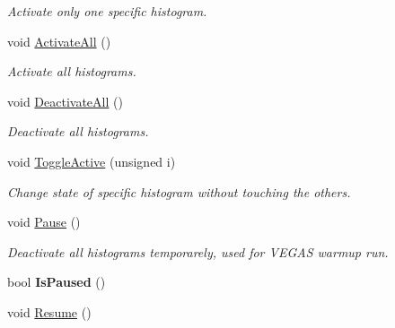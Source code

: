 \begin{DoxyCompactItemize}
\begin{DoxyCompactList}\small\item\em Activate only one specific histogram. \end{DoxyCompactList}\item 
\hypertarget{classHistArray_ab04978eb90a87464603e46337da965f0}{}void \hyperlink{classHistArray_ab04978eb90a87464603e46337da965f0}{Activate\+All} ()\label{classHistArray_ab04978eb90a87464603e46337da965f0}

\begin{DoxyCompactList}\small\item\em Activate all histograms. \end{DoxyCompactList}\item 
\hypertarget{classHistArray_a74a91eee643bcadc657103521549d275}{}void \hyperlink{classHistArray_a74a91eee643bcadc657103521549d275}{Deactivate\+All} ()\label{classHistArray_a74a91eee643bcadc657103521549d275}

\begin{DoxyCompactList}\small\item\em Deactivate all histograms. \end{DoxyCompactList}\item 
\hypertarget{classHistArray_ab6d76cb0d5bf1915dbc48f53ce498bb2}{}void \hyperlink{classHistArray_ab6d76cb0d5bf1915dbc48f53ce498bb2}{Toggle\+Active} (unsigned i)\label{classHistArray_ab6d76cb0d5bf1915dbc48f53ce498bb2}

\begin{DoxyCompactList}\small\item\em Change state of specific histogram without touching the others. \end{DoxyCompactList}\item 
\hypertarget{classHistArray_a27f9acb7029ec4c90b4476e5bc26037d}{}void \hyperlink{classHistArray_a27f9acb7029ec4c90b4476e5bc26037d}{Pause} ()\label{classHistArray_a27f9acb7029ec4c90b4476e5bc26037d}

\begin{DoxyCompactList}\small\item\em Deactivate all histograms temporarely, used for V\+E\+G\+A\+S warmup run. \end{DoxyCompactList}\item 
\hypertarget{classHistArray_a29c4b8cbb3613f5220e32be5559c55d7}{}bool {\bfseries Is\+Paused} ()\label{classHistArray_a29c4b8cbb3613f5220e32be5559c55d7}

\item 
\hypertarget{classHistArray_ab6afeb98498add41c6f810eb68ed28ba}{}void \hyperlink{classHistArray_ab6afeb98498add41c6f810eb68ed28ba}{Resume} ()\label{classHistArray_ab6afeb98498add41c6f810eb68ed28ba}


\end{DoxyCompactItemize}
